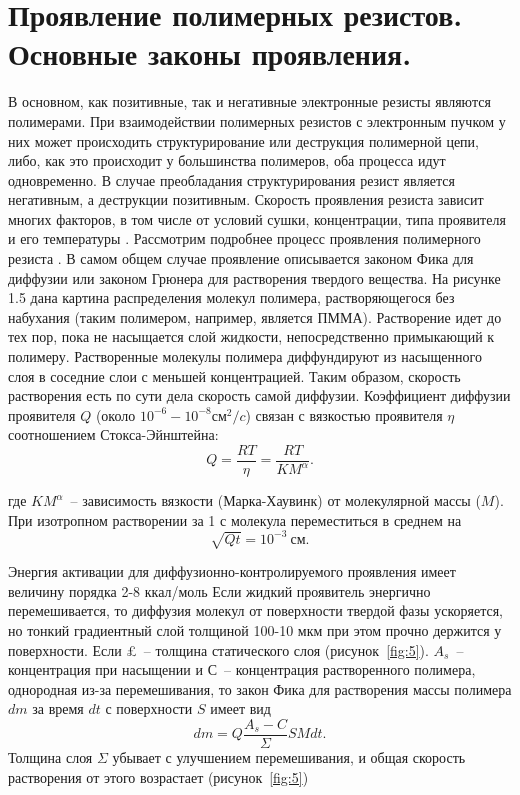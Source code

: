 \section{Проявление полимерных резистов. Основные законы проявления.}
В основном, как позитивные, так и негативные электронные резисты являются полимерами. При взаимодействии полимерных резистов с электронным пучком у них может происходить структурирование или деструкция полимерной цепи, либо, как это происходит у большинства полимеров, оба процесса идут одновременно. В случае преобладания структурирования резист является негативным, а деструкции позитивным. Скорость проявления резиста зависит многих факторов, в том числе от условий сушки, концентрации, типа проявителя и его температуры \cite{14}. Рассмотрим подробнее процесс проявления полимерного резиста \cite{15}. В самом общем случае проявление описывается законом Фика для диффузии или законом Грюнера для растворения твердого вещества. На рисунке 1.5 дана картина распределения молекул полимера, растворяющегося без набухания (таким полимером, например, является ПММА). Растворение идет до тех пор, пока не насыщается слой жидкости, непосредственно примыкающий к полимеру. Растворенные молекулы полимера диффундируют из насыщенного слоя в соседние слои с меньшей концентрацией. Таким образом, скорость растворения есть по сути дела скорость самой диффузии.
Коэффициент диффузии проявителя $Q$ (около $10^{-6}-10^{-8} см^2/c$) связан с вязкостью проявителя $\eta$ соотношением Стокса-Эйнштейна:
\begin{equation}
Q=\frac{RT}{\eta}=\frac{RT}{KM^{\alpha}}.
\label{eq:A12}
\end{equation}

где $KM^\alpha$~-- зависимость вязкости (Марка-Хаувинк) от молекулярной массы ($M$). При изотропном растворении за 1 с молекула переместиться в среднем на 
\begin{equation}
\sqrt{Qt}=10^{-3}~\text{см}.
\label{eq:A13}
\end{equation}

Энергия активации для диффузионно-контролируемого проявления имеет величину порядка 2-8 ккал/моль \cite{16}
Если жидкий проявитель энергично перемешивается, то диффузия молекул от поверхности твердой фазы ускоряется, но тонкий градиентный слой толщиной 100-10 мкм при этом прочно держится у поверхности. Если £~-- толщина статического слоя (рисунок~\ref{fig:5}). $A_s$~-- концентрация при насыщении и $С$~-- концентрация растворенного полимера, однородная из-за перемешивания, то закон Фика для растворения массы полимера $dm$ за время $dt$ с поверхности $S$ имеет вид
\begin{equation}
dm=Q\frac{A_s -C}{\Sigma}SMdt.
\label{eq:A14}
\end{equation}
Толщина слоя $\Sigma$ убывает с улучшением перемешивания, и общая скорость растворения от этого возрастает (рисунок~\ref{fig:5})

